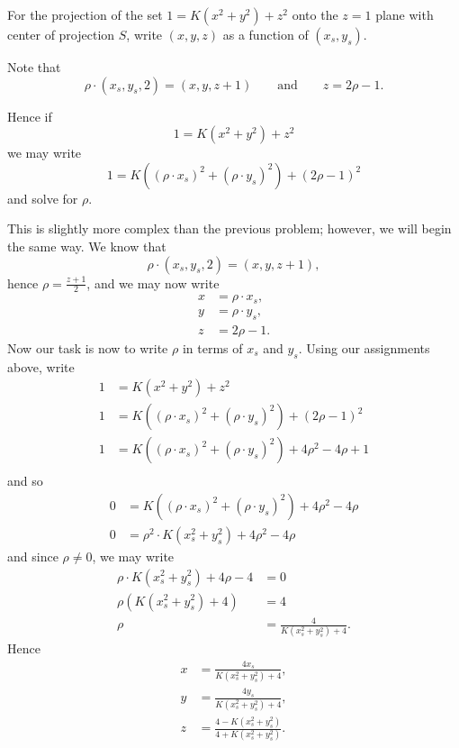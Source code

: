 \documentclass{ximera}
\begin{document}
\begin{problem}
  For the projection of the set $1=K\left(x^{2}+y^{2}\right)+z^{2}$
  onto the $z=1$ plane with center of projection $S$, write
  $(x,y,z)$ as a function of $(x_s,y_s)$.
  \begin{hint}
    Note that
      \[
      \rho\cdot(x_{s},y_{s},2)=(x,y,z+1) \qquad\text{and}\qquad z = 2\rho-1.
      \]
  \end{hint}
  \begin{hint}
    Hence if
    \[
    1 = K\left(x^2 + y^2\right) + z^2
    \]
    we may write
    \[
    1 = K\left((\rho\cdot x_s)^2 + (\rho\cdot y_s)^2\right) + (2\rho-1)^2
    \]
    and solve for $\rho$.
  \end{hint}
  \begin{freeResponse}
    This is slightly more complex than the previous problem; however,
    we will begin the same way. We know that
    \[
    \rho\cdot(x_{s},y_{s},2)=(x,y,z+1),
    \]
    hence $\rho=\frac{z+1}{2}$, and we may now write
    \begin{align*}
      x &= \rho \cdot x_s,\\
      y &= \rho \cdot y_s,\\
      z &= 2\rho-1.
    \end{align*}
    Now our task is now to write $\rho$ in terms of $x_s$ and
    $y_s$. Using our assignments above, write
    \begin{align*}
      1 &= K\left(x^2 + y^2\right) + z^2\\
      1 &= K\left((\rho\cdot x_s)^2 + (\rho\cdot y_s)^2\right) + (2\rho-1)^2\\
      1 &= K\left((\rho\cdot x_s)^2 + (\rho\cdot y_s)^2\right) + 4\rho^2-4\rho + 1\\
    \end{align*}
    and so
    \begin{align*}
      0 &= K\left((\rho\cdot x_s)^2 + (\rho\cdot y_s)^2\right) + 4\rho^2-4\rho\\
      0 &= \rho^2\cdot K\left(x_s^2 + y_s^2\right) + 4\rho^2-4\rho
    \end{align*}
    and since $\rho \ne 0$, we may write
    \begin{align*}
      \rho\cdot K\left(x_s^2 + y_s^2\right) + 4\rho-4 &=0 \\
      \rho\left(K\left(x_s^2 + y_s^2\right) + 4\right) &=4\\
      \rho &= \frac{4}{K\left(x_s^2 + y_s^2\right) + 4}.
    \end{align*}
    Hence
    \begin{align*}
      x &= \frac{4x_s}{K\left(x_s^2 + y_s^2\right) + 4},\\
      y &= \frac{4y_s}{K\left(x_s^2 + y_s^2\right) + 4},\\
      z &= \frac{4-K\left(x_s^2 + y_s^2\right)}{4+K\left(x_s^2 + y_s^2\right)}.\\
    \end{align*}
  \end{freeResponse}
\end{problem}
\end{document}
